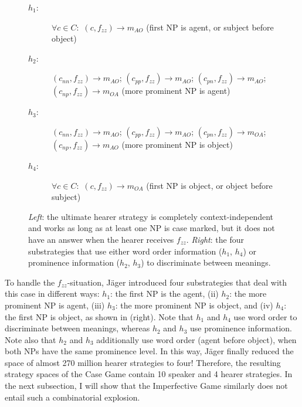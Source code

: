 \documentclass[output=paper,hidelinks]{langscibook}
\begin{document}
\begin{figure}[t]
\begin{minipage}{5cm}
\centering{}
\end{minipage}\hfill\begin{minipage}{7cm}
\centering    
\begin{description}
\item[$h_1$:] $\forall c \in C:$ $(c,f_{zz}) \rightarrow m_{AO}$ (first NP is agent, or subject before object)
\item[$h_2$:] $(c_{nn},f_{zz}) \rightarrow m_{AO}$; $(c_{pp},f_{zz}) \rightarrow m_{AO}$; $(c_{pn},f_{zz}) \rightarrow m_{AO}$; $(c_{np},f_{zz}) \rightarrow m_{OA}$ (more prominent NP is agent) 
\item[$h_3$:] $(c_{nn},f_{zz}) \rightarrow m_{AO}$; $(c_{pp},f_{zz}) \rightarrow m_{AO}$; $(c_{pn},f_{zz}) \rightarrow m_{OA}$; $(c_{np},f_{zz}) \rightarrow m_{AO}$ (more prominent NP is object)
\item[$h_4$:] $\forall c \in C:$ $(c,f_{zz}) \rightarrow m_{OA}$ (first NP is object, or object before subject)
\end{description}
\end{minipage}
\caption{\emph{Left}: the ultimate hearer strategy is completely context-independent and works as long as at least one NP is case marked, but it does not have an answer when the hearer receives $f_{zz}$. \emph{Right}: the four substrategies that use either word order information ($h_1$, $h_4$) or prominence information ($h_2$, $h_3$) to discriminate between meanings.}
\label{strat:hearer-case}
\end{figure}

To handle the $f_{zz}$-situation, Jäger introduced four substrategies that deal with this case in different ways: $h_1$: the first NP is the agent, (ii) $h_2$: the more prominent NP is agent, (iii) $h_3$: the more prominent NP is object, and (iv) $h_4$: the first NP is object, as shown in  (right). Note that $h_1$ and $h_4$ use word order to discriminate between meanings, whereas $h_2$ and $h_3$ use prominence information. Note also that $h_2$ and $h_3$ additionally use word order (agent before object), when both NPs have the same prominence level. In this way, Jäger finally reduced the space of almost 270 million hearer strategies to four! Therefore, the resulting strategy spaces of the Case Game contain 10 speaker and 4 hearer strategies. In the next subsection, I will show that the Imperfective Game similarly does not entail such a combinatorial explosion.
\end{document}
